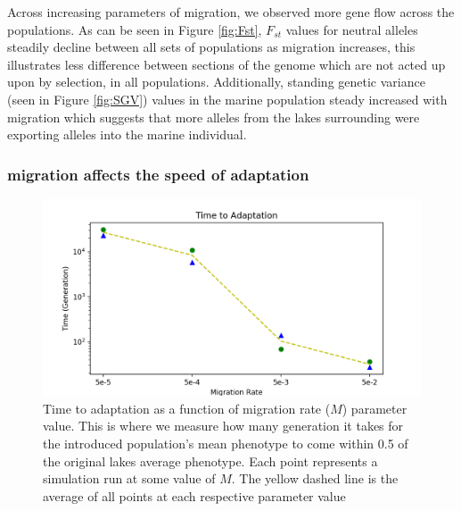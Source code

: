 \documentclass{article}
\begin{document}
Across increasing parameters of migration, we observed more gene flow across the populations. 
As can be seen in Figure \ref{fig:Fst},
$F_{st}$ values for neutral alleles steadily decline between all sets of populations as 
migration increases, this illustrates less difference between sections of the genome which are not acted up 
upon by selection, in all populations.
Additionally, standing genetic variance
(seen in Figure \ref{fig:SGV})
values in the marine population steady increased with migration which suggests that more alleles from the 
lakes surrounding were exporting alleles into the marine individual.


\subsubsection*{migration affects the speed of adaptation}

\begin{figure}
	\begin{center}
  		\includegraphics[width=0.8\linewidth]{matplotlibPlots/TimeToAdaptation.png}
  		\caption{Time to adaptation as a function of migration rate ($M$) parameter value. This is where we measure how many generation
		it takes for the introduced population's mean phenotype to come within 0.5 of the original lakes average phenotype. 
		Each point represents a simulation run at some value of $M$. 
		The yellow dashed line is the average of all points at each respective parameter value}
  		\label{fig:TimeToAdaptation}
	\end{center}
\end{figure}
\end{document}

